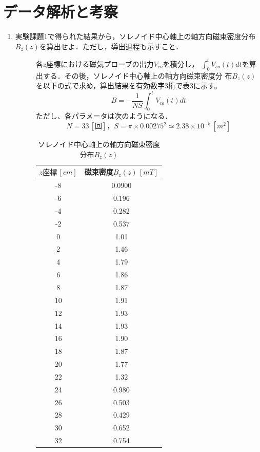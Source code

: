 
\section{データ解析と考察}
\begin{enumerate}
    \item 実験課題1で得られた結果から，ソレノイド中心軸上の軸方向磁束密度分布
    $B_z(z)$を算出せよ．ただし，導出過程も示すこと．
    \begin{description}
        \item[] 各$z$座標における磁気プローブの出力$V_{co}$を積分し，
        $\int_{0}^{t} V_{co}(t)dt$を算出する．その後，ソレノイド中心軸上の軸方向磁束密度分
        布$B_z(z)$を以下の式で求め，算出結果を有効数字3桁で表3に示す。
        $$
        B=-\frac{1}{NS}\int_{0}^{t} V_{co}(t)dt
        $$
        ただし、各パラメータは次のようになる．
        $$
        N=33\,[回]，S=\pi \times 0.00275^2 \simeq 2.38\times 10^{-5}\,[\si{m^2}]
        $$
        \begin{table}[H]
            \centering
            \caption{ソレノイド中心軸上の軸方向磁束密度分布$B_z(z)$}
            \begin{tabular}{c|c}
            \hline
            $z座標\,[\si{cm}]$ & 磁束密度$B_z(z)\,[\si{mT}]$ \\ \hline
                -8 & 0.0900 \\ 
                -6 & 0.196 \\ 
                -4 & 0.282 \\
                -2 & 0.537 \\ 
                0 & 1.01 \\ 
                2 & 1.46 \\ 
                4 & 1.79 \\ 
                6 & 1.86 \\ 
                8 & 1.87 \\ 
                10 & 1.91 \\ 
                12 & 1.93 \\ 
                14 & 1.93 \\
                16 & 1.90 \\ 
                18 & 1.87 \\ 
                20 & 1.77 \\ 
                22 & 1.32 \\ 
                24 & 0.980 \\ 
                26 & 0.503 \\ 
                28 & 0.429 \\ 
                30 & 0.652 \\ 
                32 & 0.754 \\ \hline
            \end{tabular}
        \end{table}
    \end{description}


\end{enumerate}
